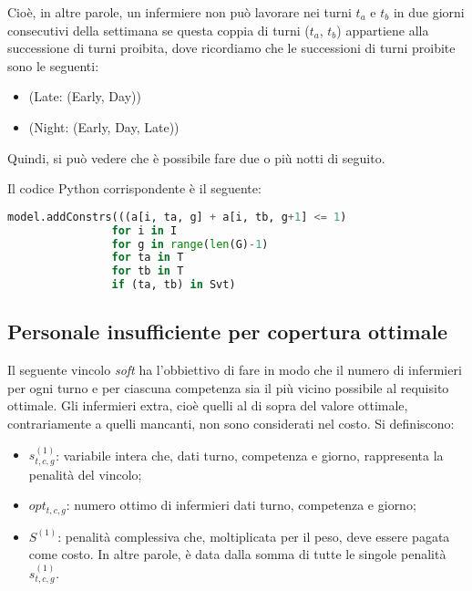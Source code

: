 Cioè, in altre parole, un infermiere non può lavorare nei turni $t_{a}$ e $t_{b}$ in due giorni consecutivi della settimana se questa coppia di turni ($t_{a}$, $t_{b}$) appartiene alla successione di turni proibita, dove ricordiamo che le successioni di turni proibite sono le seguenti:
\begin{itemize}
\item (Late: (Early, Day))
\item (Night: (Early, Day, Late))
\end{itemize}
Quindi, si può vedere che è possibile fare due o più notti di seguito.

Il codice Python corrispondente è il seguente:
\begin{lstlisting}[language=Python]
model.addConstrs(((a[i, ta, g] + a[i, tb, g+1] <= 1)
                for i in I
                for g in range(len(G)-1) 
                for ta in T
                for tb in T
                if (ta, tb) in Svt)
\end{lstlisting}

\subsection{Personale insufficiente per copertura ottimale}
Il seguente vincolo \textit{soft} ha l'obbiettivo di fare in modo che il numero di infermieri per ogni turno e per ciascuna competenza sia il più vicino possibile al requisito ottimale. 
Gli infermieri extra, cioè quelli al di sopra del valore ottimale, contrariamente a quelli mancanti, non sono considerati nel costo.
Si definiscono:
\begin{itemize}
\item $s^{(1)}_{t, c, g}$: variabile intera che, dati turno, competenza e giorno, rappresenta la penalità del vincolo;
\item $opt_{t,c,g}$: numero ottimo di infermieri dati turno, competenza e giorno;
\item $S^{(1)}$: penalità complessiva che, moltiplicata per il peso, deve essere pagata come costo. In altre parole, è data dalla somma di tutte le singole penalità $s^{(1)}_{t, c, g}$.
\end{itemize}

